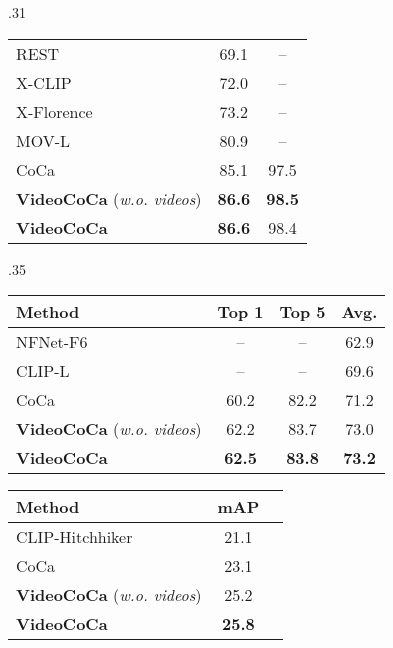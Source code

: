 \begin{table*}[t]
\begin{subtable}[t]{.31\linewidth}
{\begin{tabular}{lcc}
  				REST~\cite{bulat2022rest} & 69.1 & -- \\  X-CLIP~\cite{ni2022XCLIP}	&  72.0 &  --     \\
  				X-Florence~\cite{ni2022XCLIP} & 73.2 & -- \\  MOV-L~\cite{qian2022multimodal} & 80.9 & -- \\
  				\midrule
  				CoCa &  85.1 &  97.5  \\  \textbf{VideoCoCa} (\textit{w.o. videos}) & \textbf{86.6} & \textbf{98.5} \\ \textbf{VideoCoCa} 	& \textbf{86.6} & 98.4  \\ \bottomrule
  			\end{tabular}
  			\label{tab:sota_ucf101}
  		}	
  	\end{subtable}
  	\hfill
  	\begin{subtable}[t]{.35\linewidth}
  		\setlength{\tabcolsep}{4pt} \centering
  		\caption{Kinetics 700}
  		\vspace{-0.3\baselineskip}
  		\setlength{\tabcolsep}{6pt} \scriptsize{
  			\begin{tabular}{lccc}
  				\toprule 
  				Method & Top 1 & Top 5 & Avg. \\ 
  				\midrule
  				NFNet-F6~\cite{alayrac2022flamingo} & -- & -- & 62.9 \\  CLIP-L~\cite{alayrac2022flamingo} & -- & -- & 69.6 \\
  				\midrule
	  			CoCa & 60.2 & 82.2 & 71.2  \\
	  			\textbf{VideoCoCa} (\textit{w.o. videos}) & 62.2 & 83.7 & 73.0 \\ \textbf{VideoCoCa} 	& \textbf{62.5} & \textbf{83.8} & \textbf{73.2} \\ \bottomrule
  			\end{tabular}
  			\label{tab:sota_kinetics700}
  		}
  		\vspace{0.8\baselineskip} \centering
  		\caption{Charades}
  		\vspace{-0.2\baselineskip}
\scriptsize{
  			\begin{tabular}{lcc}
  				\toprule 
  				Method & mAP\\ 
  				\midrule
  				CLIP-Hitchhiker~\cite{bain2022cliphitchhikers} & 21.1 \\
  				\midrule
	  			CoCa & 23.1  \\
	  			\textbf{VideoCoCa} (\textit{w.o. videos}) & 25.2\\ \textbf{VideoCoCa} 	& \textbf{25.8}  \\ \bottomrule
  			\end{tabular}
  			\label{tab:sota_charades}
  		}
	\end{subtable}
	\label{tab:sota_cls}
	\vspace{-0.5\baselineskip}
\end{table*}


